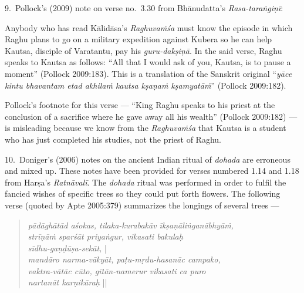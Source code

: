 9.~Pollock’s (2009) note on verse no.~3.30 from Bhānudatta’s \textsl{Rasa-taraṅgiṇī}: 

Anybody who has read Kālidāsa’s \textsl{Raghuvaṁśa} must know the episode in which Raghu plans to go on a military expedition against Kubera so he can help Kautsa, disciple of Varatantu, pay his \textsl{guru-dakṣiṇā}. In the said verse, Raghu speaks to Kautsa as follows: “All that I would ask of you, Kautsa, is to pause a moment” (Pollock 2009:183). This is a translation of the Sanskrit original “\textsl{yāce kintu bhavantam etad akhilaṁ kautsa kṣaṇaṁ kṣamyatāṁ}” (Pollock 2009:182). 

Pollock’s footnote for this verse --- “King Raghu speaks to his priest at the conclusion of a sacrifice where he gave away all his wealth” (Pollock 2009:182) --- is misleading because we know from the \textsl{Raghuvaṁśa} that Kautsa is a student who has just completed his studies, not the priest of Raghu.

10.~Doniger’s (2006) notes on the ancient Indian ritual of \textsl{dohada} are erroneous and mixed up. These notes have been provided for verses numbered 1.14 and 1.18 from Harṣa’s \textsl{Ratnāvalī}. The \textsl{dohada} ritual was performed in order to fulfil the fancied wishes of specific trees so they could put forth flowers. The following verse (quoted by Apte 2005:379) summarizes the longings of several trees ---
\begin{quote}
\textsl{pādāghātād aśokas, tilaka-kurabakāv īkṣaṇāliṅganābhyāṁ,}\\
\textsl{strīṇāṁ sparśāt priyaṅgur, vikasati bakulaḥ}\\
\textsl{sīdhu-gaṇḍūṣa-sekāt,} |\\
\textsl{mandāro narma-vākyāt, paṭu-mṛdu-hasanāc campako,}\\
\textsl{vaktra-vātāc cūto, gītān-namerur vikasati ca puro}\\
\textsl{nartanāt karṇikāraḥ} ||
\end{quote}

